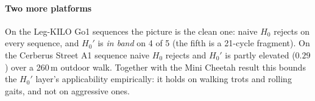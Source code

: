\paragraph{Two more platforms}
On the Leg-KILO Go1 sequences the picture is the clean one: naive $H_0$ rejects on every sequence, and $H_0'$ is
\emph{in band} on 4 of 5 (the fifth is a 21-cycle fragment). On the Cerberus Street A1 sequence naive $H_0$ rejects and
$H_0'$ is partly elevated ($0.29$) over a 260\,m outdoor walk. Together with the Mini Cheetah result this bounds the
$H_0'$ layer's applicability empirically: it holds on walking trots and rolling gaits, and not on aggressive ones.
